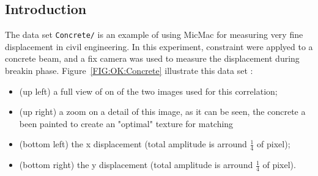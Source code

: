 \label{Concrete}

\subsection{Introduction}

The data set {\tt Concrete/} is an example of using MicMac for measuring very fine displacement in civil engineering. In this experiment, constraint were applyed to a concrete beam, and a fix camera was used to measure the displacement during breakin phase. Figure~\ref{FIG:OK:Concrete} illustrate this data set :

\begin{itemize}
    \item  (up left) a full view of on of the two images used for this correlation;
    \item  (up right) a zoom on a detail of this image, as it can be seen, the concrete a been 
           painted to create an "optimal" texture for matching
    \item  (bottom left) the x displacement (total amplitude is arround $\frac{1}{4}$ of pixel);
    \item  (bottom right) the y displacement (total amplitude is arround $\frac{1}{4}$ of pixel).
\end{itemize}

